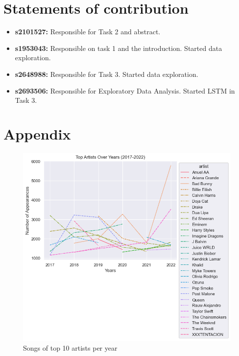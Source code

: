 \documentclass{article}
\begin{document}



\section*{Statements of contribution}
\begin{itemize}
    \item \textbf{s2101527:} Responsible for Task 2 and abstract.
    \item \textbf{s1953043:} Responsible on task 1 and the introduction. Started data exploration.
    \item \textbf{s2648988:} Responsible for Task 3. Started data exploration.
    \item \textbf{s2693506:} Responsible for Exploratory Data Analysis. Started LSTM in Task 3.

\end{itemize}




\section{Appendix}
 \begin{figure}[htbp]
     \centering
     \includegraphics[width=0.7\linewidth]{Figures/topartistsongs.png}
     \caption{Songs of top 10 artists per year}
     \label{fig:Topartists}
 \end{figure}
 
\end{document}
